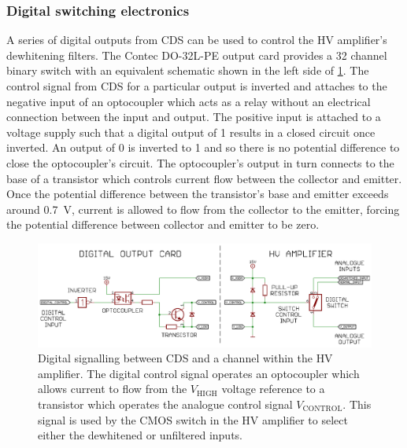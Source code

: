\subsubsection{Digital switching electronics}
A series of digital outputs from \gls{CDS} can be used to control the \gls{HV} amplifier's dewhitening filters. The Contec DO-32L-PE output card provides a 32 channel binary switch with an equivalent schematic shown in the left side of \cref{fig:hv-amp-sigital-switching}. The control signal from \gls{CDS} for a particular output is inverted and attaches to the negative input of an optocoupler which acts as a relay without an electrical connection between the input and output. The positive input is attached to a voltage supply such that a digital output of \num{1} results in a closed circuit once inverted. An output of \num{0} is inverted to \num{1} and so there is no potential difference to close the optocoupler's circuit. The optocoupler's output in turn connects to the base of a transistor which controls current flow between the collector and emitter. Once the potential difference between the transistor's base and emitter exceeds around \SI{0.7}{\volt}, current is allowed to flow from the collector to the emitter, forcing the potential difference between collector and emitter to be zero.

\begin{figure}
  \centering
  \includegraphics[width=\columnwidth]{graphics/60-hv-amp-digital-switching.pdf}
  \caption[Digital signalling between the control and data acquisition system and a channel within the high voltage amplifier]{\label{fig:hv-amp-sigital-switching}Digital signalling between \gls{CDS} and a channel within the \gls{HV} amplifier. The digital control signal operates an optocoupler which allows current to flow from the $V_{\text{HIGH}}$ voltage reference to a transistor which operates the analogue control signal $V_{\text{CONTROL}}$. This signal is used by the \gls{CMOS} switch in the \gls{HV} amplifier to select either the dewhitened or unfiltered inputs.}
\end{figure}

